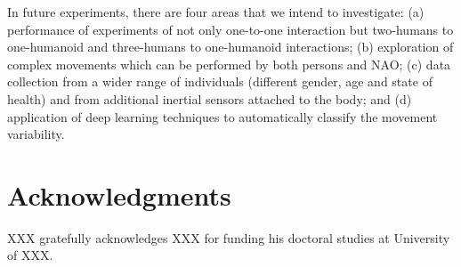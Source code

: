 \documentclass{sigchi}
\begin{document}
In future experiments, there are four areas that we intend to investigate:
(a) performance of experiments of not only one-to-one interaction but
two-humans to one-humanoid and three-humans to one-humanoid interactions;
(b) exploration of complex movements which can be performed by both persons and NAO;
(c) data collection from a wider range of individuals
(different gender, age and state of health) and from additional inertial sensors
attached to the body; and
(d) application of deep learning techniques to automatically classify the
movement variability.



\section{Acknowledgments}

XXX gratefully acknowledges XXX for funding his doctoral studies at
University of XXX.

%
%
%
%
%


\balance{}



\end{document}
